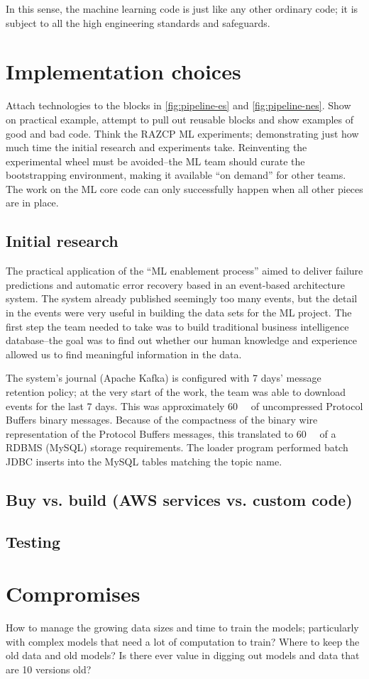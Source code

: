In this sense, the machine learning code is just like any other ordinary code; it is subject to all the high engineering standards and safeguards.

\section{Implementation choices}
Attach technologies to the blocks in \autoref{fig:pipeline-es} and \autoref{fig:pipeline-nes}. Show on practical example, attempt to pull out reusable blocks and show examples of good and bad code. Think the RAZCP ML experiments; demonstrating just how much time the initial research and experiments take. Reinventing the experimental wheel must be avoided--the ML team should curate the bootstrapping environment, making it available ``on demand'' for other teams. The work on the ML core code can only successfully happen when all other pieces are in place. 

\subsection{Initial research}
The practical application of the ``ML enablement process'' aimed to deliver failure predictions and automatic error recovery based in an event-based architecture system. The system already published seemingly too many events, but the detail in the events were very useful in building the data sets for the ML project. The first step the team needed to take was to build traditional business intelligence database--the goal was to find out whether our human knowledge and experience allowed us to find meaningful information in the data.

The system's journal (Apache Kafka\cite{kafka}) is configured with 7 days' message retention policy; at the very start of the work, the team was able to download events for the last 7 days. This was approximately \SI{60}{\gibi\byte} of uncompressed Protocol Buffers\cite{protobuf} binary messages. Because of the compactness of the binary wire representation of the Protocol Buffers messages, this translated to \SI{60}{\gibi\byte} of a RDBMS (MySQL\cite{mysql}) storage requirements. The loader program performed batch JDBC inserts into the MySQL tables matching the topic name.


\subsection{Buy vs. build (AWS services vs. custom code)}


\subsection{Testing}

\section{Compromises}
How to manage the growing data sizes and time to train the models; particularly with complex models that need a lot of computation to train? Where to keep the old data and old models? Is there ever value in digging out models and data that are 10 versions old?

\printbibliography


